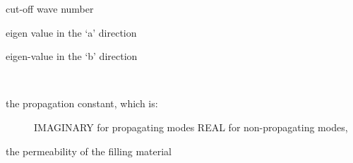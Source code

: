 \documentclass[letterpaper,10pt,english]{sphinxmanual}
\begin{document}
\begin{fulllineitems}
\begin{fulllineitems}
\end{fulllineitems}


\begin{fulllineitems}
\label{api/mwavepy.media:mwavepy.media.rectangularWaveguide.RectangularWaveguide.kc}
cut-off wave number

\end{fulllineitems}


\begin{fulllineitems}
\label{api/mwavepy.media:mwavepy.media.rectangularWaveguide.RectangularWaveguide.kx}
eigen value in the `a' direction

\end{fulllineitems}


\begin{fulllineitems}
\label{api/mwavepy.media:mwavepy.media.rectangularWaveguide.RectangularWaveguide.ky}
eigen-value in the `b' direction

\end{fulllineitems}


\begin{fulllineitems}
\label{api/mwavepy.media:mwavepy.media.rectangularWaveguide.RectangularWaveguide.kz}~\begin{description}
\item[{the propagation constant, which is:}] \leavevmode
IMAGINARY for propagating modes
REAL  for non-propagating modes,

\end{description}

\end{fulllineitems}


\begin{fulllineitems}
\label{api/mwavepy.media:mwavepy.media.rectangularWaveguide.RectangularWaveguide.mu}
the permeability of the filling material

\end{fulllineitems}


\end{fulllineitems}
\end{document}
